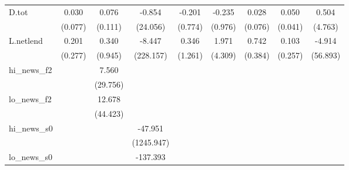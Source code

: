 {\begin{tabular}{l*{8}{c}}
\addlinespace
D.tot       &       0.030         &       0.076         &      -0.854         &      -0.201         &      -0.235         &       0.028         &       0.050         &       0.504         \\
            &     (0.077)         &     (0.111)         &    (24.056)         &     (0.774)         &     (0.976)         &     (0.076)         &     (0.041)         &     (4.763)         \\
\addlinespace
L.netlend   &       0.201         &       0.340         &      -8.447         &       0.346         &       1.971         &       0.742\sym{*}  &       0.103         &      -4.914         \\
            &     (0.277)         &     (0.945)         &   (228.157)         &     (1.261)         &     (4.309)         &     (0.384)         &     (0.257)         &    (56.893)         \\
\addlinespace
hi\_news\_f2  &                     &       7.560         &                     &                     &                     &                     &                     &                     \\
            &                     &    (29.756)         &                     &                     &                     &                     &                     &                     \\
\addlinespace
lo\_news\_f2  &                     &      12.678         &                     &                     &                     &                     &                     &                     \\
            &                     &    (44.423)         &                     &                     &                     &                     &                     &                     \\
\addlinespace
hi\_news\_s0  &                     &                     &     -47.951         &                     &                     &                     &                     &                     \\
            &                     &                     &  (1245.947)         &                     &                     &                     &                     &                     \\
\addlinespace
lo\_news\_s0  &                     &                     &    -137.393         &                     &                     &                     &                     &                     \\

\end{tabular}}
